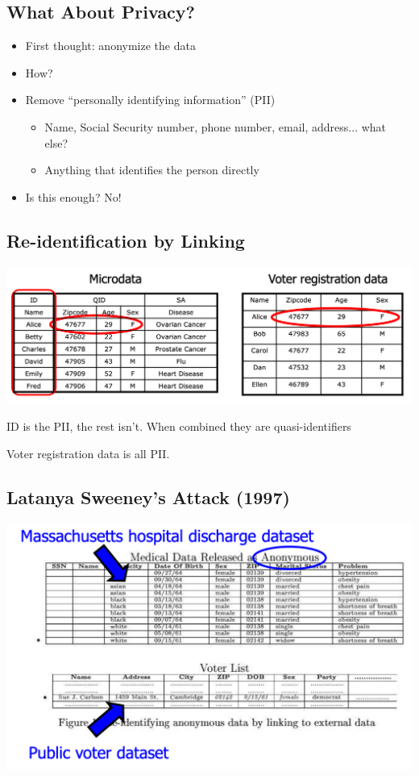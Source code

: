 \documentclass[11pt]{article}
\theoremstyle{definition}
\begin{document}
\subsection{What About Privacy?}
\begin{itemize}
    \item First thought: anonymize the data
    \item How?
    \item Remove “personally identifying information” (PII)
    \begin{itemize}
        \item Name, Social Security number, phone number, email, address... what else?
        \item Anything that identifies the person directly
    \end{itemize}
    \item Is this enough? No!
\end{itemize}

\subsection{Re-identification by Linking}
\includegraphics[width=\textwidth/2]{14.png}

ID is the PII, the rest isn't. When combined they are quasi-identifiers

Voter registration data is all PII.

\subsection{Latanya Sweeney’s Attack (1997)}
\includegraphics[width=\textwidth/2]{15.png}
\end{document}
